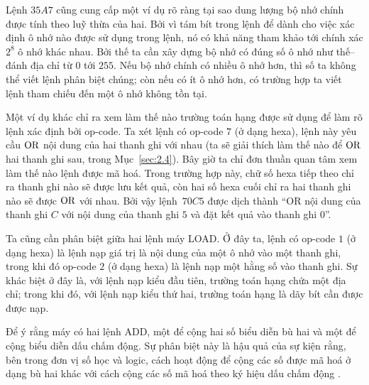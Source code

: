 Lệnh $35A7$ cũng cung cấp một ví dụ rõ ràng tại sao dung lượng bộ nhớ chính được tính theo
luỹ thừa của hai. Bởi vì tám bít trong lệnh để dành cho việc xác định ô nhớ nào được sử
dụng trong lệnh, nó có khả năng tham khảo tới chính xác $2^8$ ô nhớ khác nhau. Bởi thế ta
cần xây dựng bộ nhớ có đúng số ô nhớ như thế--đánh địa chỉ từ $0$ tới $255$. Nếu bộ nhớ
chính có nhiều ô nhớ hơn, thì số ta không thể viết lệnh phân biệt chúng; còn nếu có ít ô
nhớ hơn, có trường hợp ta viết lệnh tham chiếu đến một ô nhớ không tồn tại.


Một ví dụ khác chỉ ra xem làm thế nào trường toán hạng được sử dụng để làm rõ lệnh xác
định bởi op-code. Ta xét lệnh có op-code $7$ (ở dạng hexa), lệnh này yêu cầu $\operatorname{\mbox{OR}}$ nội
dung của hai thanh ghi với nhau (ta sẽ giải thích làm thế nào để $\operatorname{\mbox{OR}}$ hai thanh ghi sau,
trong Mục~\ref{sec:2.4}). Bây giờ ta chỉ đơn thuần quan tâm xem làm thế nào lệnh được mã
hoá. Trong trường hợp này, chữ số hexa tiếp theo chỉ ra thanh ghi nào sẽ được lưu kết quả,
còn hai số hexa cuối chỉ ra hai thanh ghi nào sẽ được $\operatorname{\mbox{OR}}$ với nhau. Bởi vậy lệnh~$70C5$
được dịch thành ``OR nội dung của thanh ghi $C$ với nội dung của thanh ghi $5$ và đặt kết
quả vào thanh ghi $0$''.

Ta cũng cần phân biệt giữa hai lệnh máy LOAD. Ở đây ta, lệnh có op-code $1$ (ở dạng hexa)
là lệnh nạp giá trị là nội dung của một ô nhớ vào một thanh ghi, trong khi đó op-code $2$
(ở dạng hexa) là lệnh nạp một hằng số vào thanh ghi. Sự khác biệt ở đây là, với lệnh nạp
kiểu đầu tiên, trường toán hạng chứa một địa chỉ; trong khi đó, với lệnh nạp kiểu thứ hai,
trường toán hạng là dãy bít cần được được nạp.

Để ý rằng máy có hai lệnh ADD, một để cộng hai số biểu diễn bù hai và một để cộng biểu
diễn dấu chấm động. Sự phân biệt này là hậu quả của sự kiện rằng, bên trong đơn vị số học
và logic, cách hoạt động để cộng các số được mã hoá ở dạng bù hai khác với cách cộng các
số mã hoá theo ký hiệu dấu chấm động .

